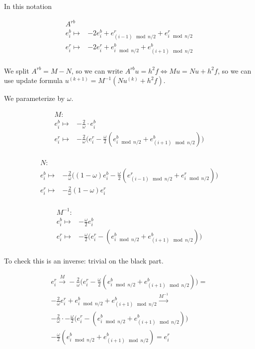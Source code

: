 \documentclass{article}
\begin{document}
\newpage

In this notation

\begin{align*}
    A^{rb} & \\
    e^b_{i} \mapsto & -2e^b_{i} + e^r_{(i - 1) \mod n / 2} + e^r_{i \mod n / 2} \\
    e^r_{i} \mapsto & -2e^r_{i} + e^b_{i \mod n / 2} + e^b_{(i + 1) \mod n / 2} \\ 
\end{align*}

We split $A^{rb} = M - N$, so we can write $A^{rb}u = h^2f \iff Mu = Nu + h^2f$,
so we can use update formula $u^{(k + 1)} = M^{-1}(Nu^{(k)} + h^2f)$.


We parameterize by $\omega$.

\begin{align*}
    M : & \\
    e^b_{i} \mapsto & -\frac{2}{\omega}\cdot e^b_{i} \\
    e^r_{i} \mapsto & -\frac{2}{\omega}\big(e^r_{i} - \frac{\omega}{2} (e^b_{i \mod n / 2} + e^b_{(i + 1) \mod n / 2}) \big) \\
\end{align*}

\begin{align*}
    N : & \\
    e^b_{i} \mapsto & -\frac{2}{\omega}\big((1 - \omega)e^b_{i} - \frac{\omega}{2} (e^r_{(i - 1) \mod n / 2} + e^r_{i \mod n / 2}) \big) \\
    e^r_{i} \mapsto & -\frac{2}{\omega}(1 - \omega)e^r_{i} \\
\end{align*}

\begin{align*}
    M^{-1} : & \\
    e^b_{i} \mapsto & -\frac{\omega}{2} e^b_{i} \\
    e^r_{i} \mapsto & -\frac{\omega}{2}\big(e^r_{i} - (e^b_{i \mod n / 2} + e^b_{(i + 1) \mod n / 2}) \big) \\
\end{align*}


To check this is an inverse: trivial on the black part.

\begin{align*}
    e^r_i \xrightarrow{M} -\frac{2}{\omega}\big(e^r_{i} - \frac{\omega}{2} (e^b_{i \mod n / 2} + e^b_{(i + 1) \mod n / 2}) \big) = \\
    -\frac{2}{\omega}e^r_i + e^b_{i \mod n / 2} + e^b_{(i + 1) \mod n / 2} \xrightarrow{M^{-1}}  \\
    -\frac{2}{\omega} \cdot -\frac{\omega}{2}\big(e^r_{i} - (e^b_{i \mod n / 2} + e^b_{(i + 1) \mod n / 2}) \big) \\
    - \frac{\omega}{2}\left(e^b_{i \mod n / 2} + e^b_{(i + 1) \mod n / 2}\right) = e^r_i
\end{align*}
\end{document}
